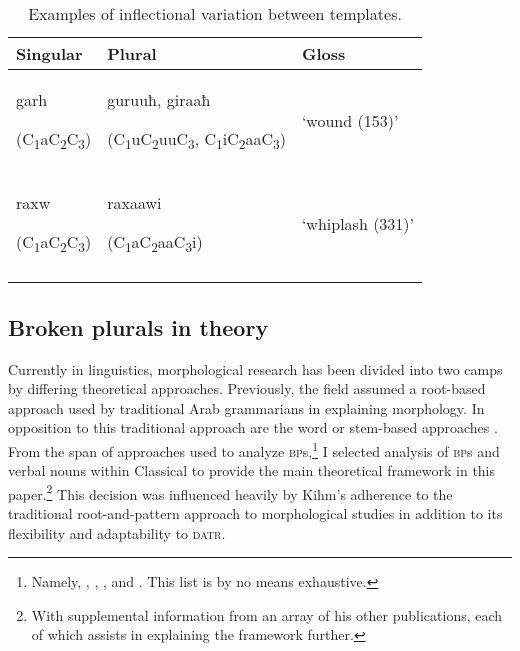 \documentclass[output=paper,modfonts]{langscibook}
\begin{document}
\begin{table}
\begin{tabularx}{\textwidth}{XXX}
\lsptoprule
Singular & Plural & Gloss\\
\midrule 
garh

(C\textsubscript{1}aC\textsubscript{2}C\textsubscript{3}) & guruuħ, giraaħ 

(C\textsubscript{1}uC\textsubscript{2}uuC\textsubscript{3}, C\textsubscript{1}iC\textsubscript{2}aaC\textsubscript{3}) & ‘wound (153)’\\
\tablevspace 

raxw

(C\textsubscript{1}aC\textsubscript{2}C\textsubscript{3}) & raxaawi  

(C\textsubscript{1}aC\textsubscript{2}aaC\textsubscript{3}i) & ‘whiplash (331)’\\
\lspbottomrule
\end{tabularx}
\caption{Examples of inflectional variation between templates.}
\label{tab:winchester:2}
\end{table}

\subsection{Broken plurals in theory} 

Currently in  linguistics, morphological research has been divided into two camps by differing theoretical approaches. Previously, the field assumed a root-based approach used by traditional Arab grammarians in explaining  morphology. In opposition to this traditional approach are the word or stem-based approaches \citep[71--91]{Ratcliffe2013}. From the span of approaches used to analyze \textsc{bp}s,\footnote{ Namely, \citet{Hammond1988}, \citet{McCarthyPrince1990}, \citet{Ratcliffe1998}, and \citet{Kihm2006}. This list is by no means exhaustive.} I selected  analysis of \textsc{bp}s and verbal nouns within Classical  to provide the main theoretical framework in this paper.\footnote{ With supplemental information from an array of his other publications, each of which assists in explaining the framework further.} This decision was influenced heavily by Kihm’s adherence to the traditional root-and-pattern approach to  morphological studies in addition to its flexibility and adaptability to \textsc{datr}. 
\end{document}
